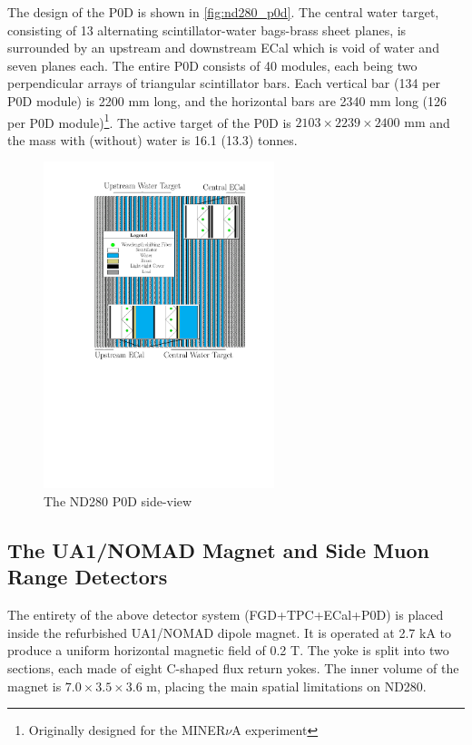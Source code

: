 The design of the P0D is shown in \autoref{fig:nd280_p0d}. The central water target, consisting of 13 alternating scintillator-water bags-brass sheet planes, is surrounded by an upstream and downstream ECal which is void of water and seven planes each. The entire P0D consists of 40 modules, each being two perpendicular arrays of triangular scintillator bars. Each vertical bar (134 per P0D module) is 2200 mm long, and the horizontal bars are 2340 mm long (126 per P0D module)\footnote{Originally designed for the MINER$\nu$A experiment\cite{minerva_design}}. The active target of the P0D is $2103\times2239\times2400\text{ mm}$ and the mass with (without) water is 16.1 (13.3) tonnes.
\begin{figure}[h]
	\includegraphics[width=0.6\textwidth, trim={0mm 110mm 0mm 0mm}, clip,page=1]{figures/det_chap/p0d/p0d.pdf}
	\caption{The ND280 P0D side-view}
	\label{fig:nd280_p0d}
\end{figure}

\subsection{The UA1/NOMAD Magnet and Side Muon Range Detectors}
The entirety of the above detector system (FGD+TPC+ECal+P0D) is placed inside the refurbished UA1/NOMAD dipole magnet. It is operated at 2.7 kA to produce a uniform horizontal magnetic field of 0.2 T. The  yoke is split into two sections, each made of eight C-shaped flux return yokes. The inner volume of the magnet is $7.0\times3.5\times3.6\text{ m}$, placing the main spatial limitations on ND280.

